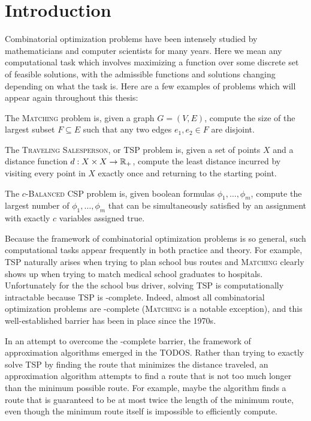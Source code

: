 \chapter{Introduction}
Combinatorial optimization problems have been intensely studied by mathematicians and computer scientists for many years.
Here we mean any computational task which involves maximizing a function over some discrete set of feasible solutions, with the admissible functions and solutions changing depending on what the task is. 
Here are a few examples of problems which will appear again throughout this thesis:
\begin{example}
The \textsc{Matching} problem is, given a graph $G = (V,E)$, compute the size of the largest subset $F \subseteq E$ such that any two edges $e_1,e_2 \in F$ are disjoint.
\end{example}
\begin{example}
The \textsc{Traveling Salesperson}, or \textsc{TSP} problem is, given a set of points $X$ and a distance function $d: X \times X \rightarrow \mathbb R_+$, compute the least distance incurred by visiting every point in $X$ exactly once and returning to the starting point. 
\end{example}
\begin{example}
The \textsc{$c$-Balanced CSP} problem is, given boolean formulas $\phi_1,\dots,\phi_m$, compute the largest number of $\phi_1,\dots,\phi_m$ that can be simultaneously satisfied by an assignment with exactly $c$ variables assigned true. 
\end{example}

Because the framework of combinatorial optimization problems is so general, such computational tasks appear frequently in both practice and theory.
For example, \textsc{TSP} naturally arises when trying to plan school bus routes and \textsc{Matching} clearly shows up when trying to match medical school graduates to hospitals. Unfortunately for the the school bus driver, solving \textsc{TSP} is computationally intractable because \textsc{TSP} is \np-complete\cite{}. Indeed, almost all combinatorial optimization problems are \np-complete (\textsc{Matching} is a notable exception), and this well-established barrier has been in place since the 1970s. 

In an attempt to overcome the \np-complete barrier, the framework of approximation algorithms emerged in the TODOS\cite{}. Rather than trying to exactly solve \textsc{TSP} by finding the route that minimizes the distance traveled, an approximation algorithm attempts to find a route that is not too much longer than the minimum possible route. For example, maybe the algorithm finds a route that is guaranteed to be at most twice the length of the minimum route, even though the minimum route itself is impossible to efficiently compute. 

